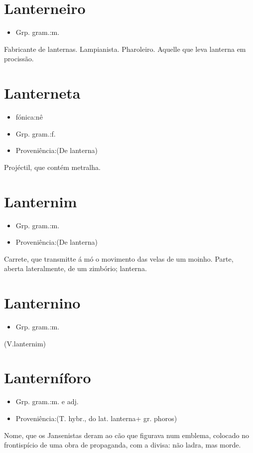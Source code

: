 \section{Lanterneiro}
\begin{itemize}
\item {Grp. gram.:m.}
\end{itemize}
Fabricante de lanternas.
Lampianista.
Pharoleiro.
Aquelle que leva lanterna em procissão.
\section{Lanterneta}
\begin{itemize}
\item {fónica:nê}
\end{itemize}
\begin{itemize}
\item {Grp. gram.:f.}
\end{itemize}
\begin{itemize}
\item {Proveniência:(De \textunderscore lanterna\textunderscore )}
\end{itemize}
Projéctil, que contém metralha.
\section{Lanternim}
\begin{itemize}
\item {Grp. gram.:m.}
\end{itemize}
\begin{itemize}
\item {Proveniência:(De \textunderscore lanterna\textunderscore )}
\end{itemize}
Carrete, que transmitte á mó o movimento das velas de um moinho.
Parte, aberta lateralmente, de um zimbório; lanterna.
\section{Lanternino}
\begin{itemize}
\item {Grp. gram.:m.}
\end{itemize}
(V.lanternim)
\section{Lanterníforo}
\begin{itemize}
\item {Grp. gram.:m.  e  adj.}
\end{itemize}
\begin{itemize}
\item {Proveniência:(T. hybr., do lat. \textunderscore lanterna\textunderscore  + gr. \textunderscore phoros\textunderscore )}
\end{itemize}
Nome, que os Jansenistas deram ao cão que figurava num emblema, colocado no frontispício de uma obra de propaganda, com a divisa: \textunderscore não ladra, mas morde\textunderscore .
